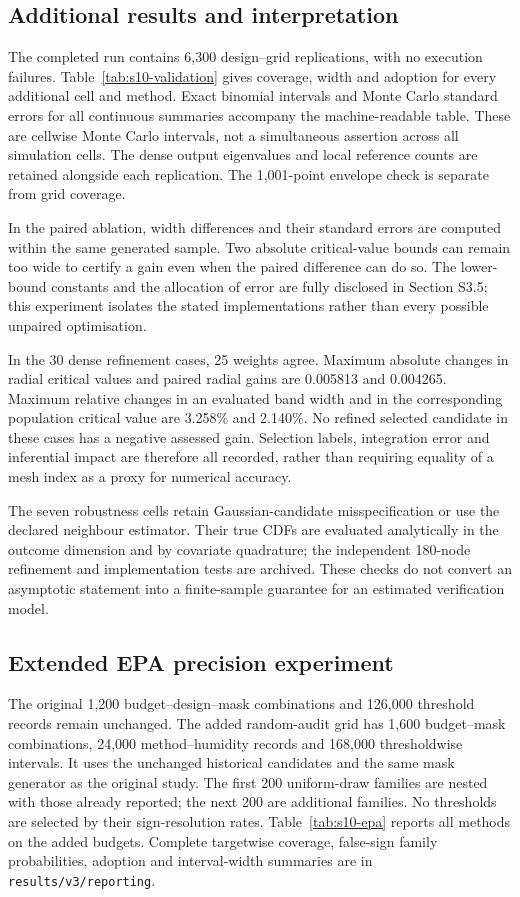 \subsection{Additional results and interpretation}
The completed run contains 6,300 design--grid replications, with no execution failures. Table~\ref{tab:s10-validation} gives coverage, width and adoption for every additional cell and method. Exact binomial intervals and Monte Carlo standard errors for all continuous summaries accompany the machine-readable table. These are cellwise Monte Carlo intervals, not a simultaneous assertion across all simulation cells. The dense output eigenvalues and local reference counts are retained alongside each replication. The 1,001-point envelope check is separate from grid coverage.

In the paired ablation, width differences and their standard errors are computed within the same generated sample. Two absolute critical-value bounds can remain too wide to certify a gain even when the paired difference can do so. The lower-bound constants and the allocation of error are fully disclosed in Section S3.5; this experiment isolates the stated implementations rather than every possible unpaired optimisation.

In the 30 dense refinement cases, 25 weights agree. Maximum absolute changes in radial critical values and paired radial gains are 0.005813 and 0.004265. Maximum relative changes in an evaluated band width and in the corresponding population critical value are 3.258\% and 2.140\%. No refined selected candidate in these cases has a negative assessed gain. Selection labels, integration error and inferential impact are therefore all recorded, rather than requiring equality of a mesh index as a proxy for numerical accuracy.

The seven robustness cells retain Gaussian-candidate misspecification or use the declared neighbour estimator. Their true CDFs are evaluated analytically in the outcome dimension and by covariate quadrature; the independent 180-node refinement and implementation tests are archived. These checks do not convert an asymptotic statement into a finite-sample guarantee for an estimated verification model.

\subsection{Extended EPA precision experiment}
The original 1,200 budget--design--mask combinations and 126,000 threshold records remain unchanged. The added random-audit grid has 1,600 budget--mask combinations, 24,000 method--humidity records and 168,000 thresholdwise intervals. It uses the unchanged historical candidates and the same mask generator as the original study. The first 200 uniform-draw families are nested with those already reported; the next 200 are additional families. No thresholds are selected by their sign-resolution rates. Table~\ref{tab:s10-epa} reports all methods on the added budgets. Complete targetwise coverage, false-sign family probabilities, adoption and interval-width summaries are in \texttt{results/v3/reporting}.

